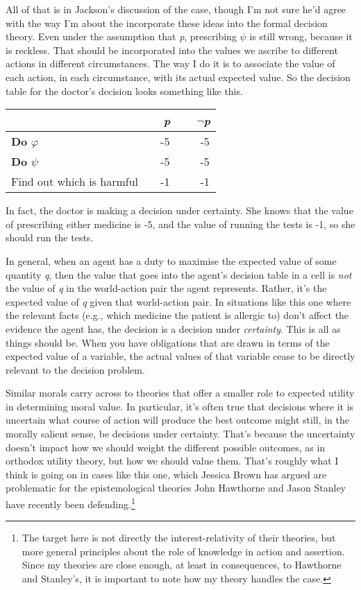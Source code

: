 \documentclass[
  10pt,
  letterpaper,
  DIV=11,
  numbers=noendperiod,
  twoside]{scrartcl}
\begin{document}
All of that is in Jackson's discussion of the case, though I'm not sure
he'd agree with the way I'm about the incorporate these ideas into the
formal decision theory. Even under the assumption that \emph{p},
prescribing \(\psi\) is still wrong, because it is reckless. That should
be incorporated into the values we ascribe to different actions in
different circumstances. The way I do it is to associate the value of
each action, in each circumstance, with its actual expected value. So
the decision table for the doctor's decision looks something like this.

\begin{longtable}[]{@{}lcc@{}}
\toprule\noalign{}
~ & ~\emph{p}~ & ~\(\neg\)\emph{p} \\
\midrule\noalign{}
\endhead
\bottomrule\noalign{}
\endlastfoot
\textbf{Do} \(\varphi\) ~ & ~-5 ~ & ~ -5 \\
\textbf{Do} \(\psi\) ~ & ~-5 ~ & ~ -5 \\
Find out which is harmful~ & ~-1 ~ & ~ -1 \\
\end{longtable}

In fact, the doctor is making a decision under certainty. She knows that
the value of prescribing either medicine is -5, and the value of running
the tests is -1, so she should run the tests.

In general, when an agent has a duty to maximise the expected value of
some quantity \emph{q}, then the value that goes into the agent's
decision table in a cell is \emph{not} the value of \emph{q} in the
world-action pair the agent represents. Rather, it's the expected value
of \emph{q} given that world-action pair. In situations like this one
where the relevant facts (e.g., which medicine the patient is allergic
to) don't affect the evidence the agent has, the decision is a decision
under \emph{certainty}. This is all as things should be. When you have
obligations that are drawn in terms of the expected value of a variable,
the actual values of that variable cease to be directly relevant to the
decision problem.

Similar morals carry across to theories that offer a smaller role to
expected utility in determining moral value. In particular, it's often
true that decisions where it is uncertain what course of action will
produce the best outcome might still, in the morally salient sense, be
decisions under certainty. That's because the uncertainty doesn't impact
how we should weight the different possible outcomes, as in orthodox
utility theory, but how we should value them. That's roughly what I
think is going on in cases like this one, which Jessica Brown has argued
are problematic for the epistemological theories John Hawthorne and
Jason Stanley have recently been defending.\footnote{The target here is
  not directly the interest-relativity of their theories, but more
  general principles about the role of knowledge in action and
  assertion. Since my theories are close enough, at least in
  consequences, to Hawthorne and Stanley's, it is important to note how
  my theory handles the case.}
\end{document}
